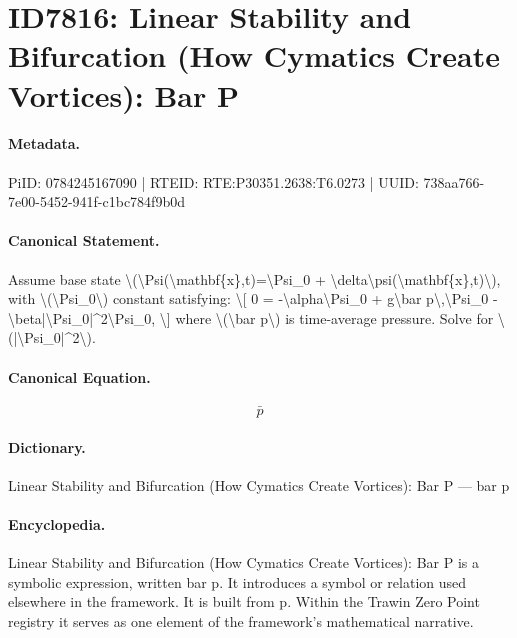 \section*{ID7816: Linear Stability and Bifurcation (How Cymatics Create Vortices): Bar P}
\paragraph{Metadata.}
PiID: 0784245167090 | RTEID: RTE:P30351.2638:T6.0273 | UUID: 738aa766-7e00-5452-941f-c1bc784f9b0d

\paragraph{Canonical Statement.}
Assume base state \textbackslash{}(\textbackslash{}Psi(\textbackslash{}mathbf\{x\},t)=\textbackslash{}Psi\_0 + \textbackslash{}delta\textbackslash{}psi(\textbackslash{}mathbf\{x\},t)\textbackslash{}), with \textbackslash{}(\textbackslash{}Psi\_0\textbackslash{}) constant satisfying: \textbackslash{}[ 0 = -\textbackslash{}alpha\textbackslash{}Psi\_0 + g\textbackslash{}bar p\textbackslash{},\textbackslash{}Psi\_0 - \textbackslash{}beta|\textbackslash{}Psi\_0|\textasciicircum{}2\textbackslash{}Psi\_0, \textbackslash{}] where \textbackslash{}(\textbackslash{}bar p\textbackslash{}) is time-average pressure. Solve for \textbackslash{}(|\textbackslash{}Psi\_0|\textasciicircum{}2\textbackslash{}).

\paragraph{Canonical Equation.}
\[
\bar p
\]

\paragraph{Dictionary.}
Linear Stability and Bifurcation (How Cymatics Create Vortices): Bar P — bar p

\paragraph{Encyclopedia.}
Linear Stability and Bifurcation (How Cymatics Create Vortices): Bar P is a symbolic expression, written bar p. It introduces a symbol or relation used elsewhere in the framework. It is built from p. Within the Trawin Zero Point registry it serves as one element of the framework's mathematical narrative.

